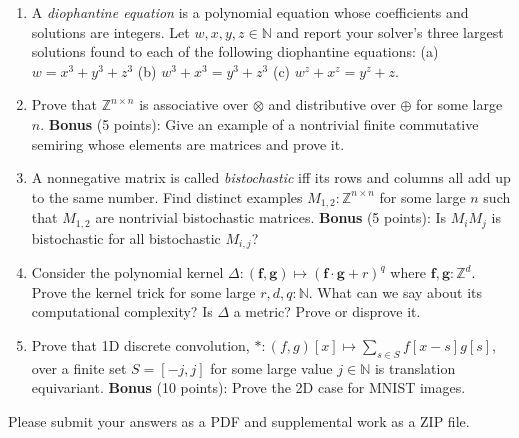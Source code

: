 \documentclass[11pt]{article}
\begin{document}
    \begin{enumerate}
        \item A \textit{diophantine equation} is a polynomial equation whose coefficients and solutions are integers. Let $w, x, y, z \in \mathbb{N}$ and report your solver's three largest solutions found to each of the following diophantine equations: (a) $w = x^3+y^3+z^3$ (b) $w^3 + x^3 = y^3+z^3$ (c) $w^z + x^z = y^z + z$.
        \item Prove that $\mathbb{Z}^{n\times n}$ is associative over $\otimes$ and distributive over $\oplus$ for some large $n$. \textbf{Bonus} (5 points): Give an example of a nontrivial finite commutative semiring whose elements are matrices and prove it.
        \item A nonnegative matrix is called \textit{bistochastic} iff its rows and columns all add up to the same number. Find distinct examples $M_{1, 2}: \mathbb{Z}^{n\times n}$ for some large $n$ such that $M_{1,2}$ are nontrivial bistochastic matrices. \textbf{Bonus} (5 points): Is $M_i M_j$ is bistochastic for all bistochastic $M_{i, j}$?
        \item Consider the polynomial kernel $\Delta: (\mathbf{f}, \mathbf{g})\mapsto (\mathbf{f}\cdot\mathbf{g} + r)^q$ where $\mathbf{f, g}: \mathbb{Z}^d$. Prove the kernel trick for some large $r, d, q: \mathbb{N}$. What can we say about its computational complexity? Is $\Delta$ a metric? Prove or disprove it.
        \item Prove that 1D discrete convolution, $*: (f, g)[x] \mapsto \sum_{s \in S}f[x-s]g[s]$, over a finite set $S=[-j, j]$ for some large value $j \in \mathbb{N}$ is translation equivariant. \textbf{Bonus} (10 points): Prove the 2D case for MNIST images.
    \end{enumerate}

    \noindent Please submit your answers as a PDF and supplemental work as a ZIP file.
\end{document}
